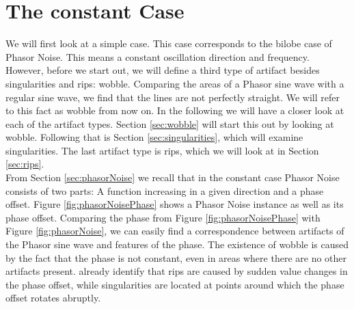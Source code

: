 \documentclass{utue} %
\begin{document}
\section{The constant Case}
We will first look at a simple case. This case corresponds to the bilobe case of Phasor Noise. This means a constant oscillation direction and frequency. However, before we start out, we will define a third type of artifact besides singularities and rips: wobble. Comparing the areas of a Phasor sine wave with a regular sine wave, we find that the lines are not perfectly straight. We will refer to this fact as wobble from now on. In the following we will have a closer look at each of the artifact types. Section \ref{sec:wobble} will start this out by looking at wobble. Following that is Section \ref{sec:singularities}, which will examine singularities. The last artifact type is rips, which we will look at in Section \ref{sec:rips}.\\
From Section \ref{sec:phasorNoise} we recall that in the constant case Phasor Noise consists of two parts: A function increasing in a given direction and a phase offset. Figure \ref{fig:phasorNoisePhase} shows a Phasor Noise instance as well as its phase offset. Comparing the phase from Figure \ref{fig:phasorNoisePhase} with Figure \ref{fig:phasorNoise}, we can easily find a correspondence between artifacts of the Phasor sine wave and features of the phase. The existence of wobble is caused by the fact that the phase is not constant, even in areas where there are no other artifacts present. \citeauthor{phasorNoise} already identify that rips are caused by sudden value changes in the phase offset, while singularities are located at points around which the phase offset rotates abruptly.\\
\end{document}
